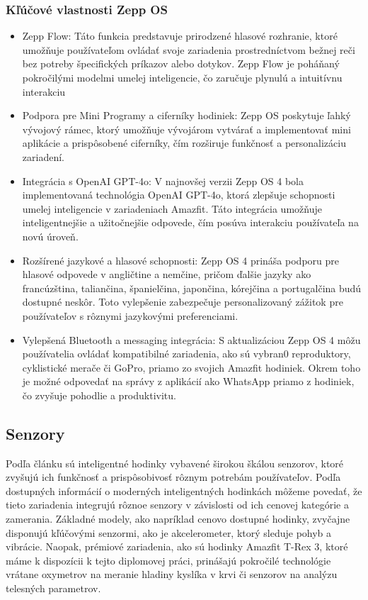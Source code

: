 \subsubsection{Kľúčové vlastnosti Zepp OS}

\begin{itemize}
    \item Zepp Flow: Táto funkcia predstavuje prirodzené hlasové rozhranie, ktoré umožňuje používateľom ovládať svoje zariadenia prostredníctvom bežnej reči bez potreby špecifických príkazov alebo dotykov. Zepp Flow je poháňaný pokročilými modelmi umelej inteligencie, čo zaručuje plynulú a intuitívnu interakciu \cite{zepp-flow}
    \item Podpora pre Mini Programy a ciferníky hodiniek: Zepp OS poskytuje ľahký vývojový rámec, ktorý umožňuje vývojárom vytvárať a implementovať mini aplikácie a prispôsobené ciferníky, čím rozširuje funkčnosť a personalizáciu zariadení.
    \item Integrácia s OpenAI GPT-4o: V najnovšej verzii Zepp OS 4 bola implementovaná technológia OpenAI GPT-4o, ktorá zlepšuje schopnosti umelej inteligencie v zariadeniach Amazfit. Táto integrácia umožňuje inteligentnejšie a užitočnejšie odpovede, čím posúva interakciu používateľa na novú úroveň. \cite{zepp-chatgpt}
    \item Rozšírené jazykové a hlasové schopnosti: Zepp OS 4 prináša podporu pre hlasové odpovede v angličtine a nemčine, pričom ďalšie jazyky ako francúzština, taliančina, španielčina, japončina, kórejčina a portugalčina budú dostupné neskôr. Toto vylepšenie zabezpečuje personalizovaný zážitok pre používateľov s rôznymi jazykovými preferenciami. \cite{zepp-voice}
    \item Vylepšená Bluetooth a messaging integrácia: S aktualizáciou Zepp OS 4 môžu používatelia ovládať kompatibilné zariadenia, ako sú vybran0 reproduktory, cyklistické merače či GoPro, priamo zo svojich Amazfit hodiniek. Okrem toho je možné odpovedať na správy z aplikácií ako WhatsApp priamo z hodiniek, čo zvyšuje pohodlie a produktivitu. \cite{zepp-bt}
\end{itemize}

\subsection{Senzory}
Podľa článku sú inteligentné hodinky vybavené širokou škálou senzorov, ktoré zvyšujú ich funkčnosť a prispôsobivosť rôznym potrebám používateľov. Podľa dostupných informácií o moderných inteligentných hodinkách môžeme povedať, že tieto zariadenia integrujú rôznoe senzory v závislosti od ich cenovej kategórie a zamerania. Základné modely, ako napríklad cenovo dostupné hodinky, zvyčajne disponujú kľúčovými senzormi, ako je akcelerometer, ktorý sleduje pohyb a vibrácie. Naopak, prémiové zariadenia, ako sú hodinky Amazfit T-Rex 3, ktoré máme k dispozícii k tejto diplomovej práci, prinášajú pokročilé technológie vrátane oxymetrov na meranie hladiny kyslíka v krvi či senzorov na analýzu telesných parametrov. \cite{sensors-article}

